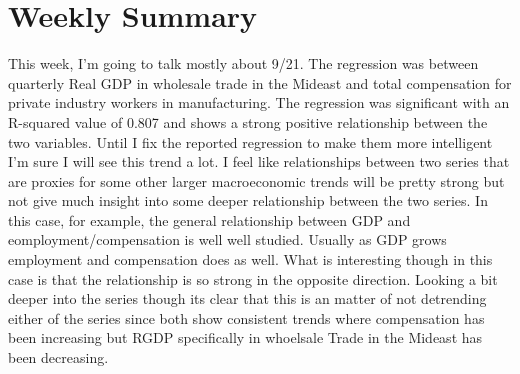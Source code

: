 \section{Weekly Summary}

This week, I'm going to talk mostly about 9/21. The regression was between quarterly Real GDP in wholesale trade 
in the Mideast and total compensation for private industry workers in manufacturing. The regression was significant with an 
R-squared value of 0.807 and shows a strong positive relationship between the two variables. Until I fix the reported regression to
make them more intelligent I'm sure I will see this trend a lot. I feel like relationships between two series that are proxies 
for some other larger macroeconomic trends will be pretty strong but not give much insight into some deeper relationship between
the two series. In this case, for example, the general relationship between GDP and eomployment/compensation is well well studied.
Usually as GDP grows employment and compensation does as well. What is interesting though in this case is that the relationship 
is so strong in the opposite direction. Looking a bit deeper into the series though its clear that this is an matter of not 
detrending either of the series since both show consistent trends where compensation has been increasing but RGDP specifically
in whoelsale Trade in the Mideast has been decreasing.